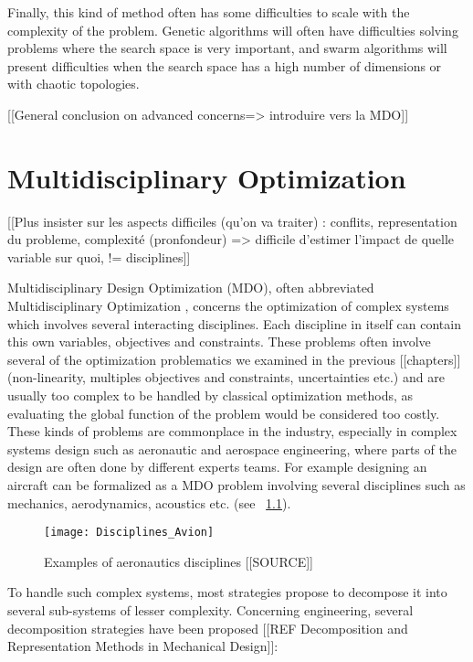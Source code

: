 Finally, this kind of method often has some difficulties to scale with the complexity of the problem. Genetic algorithms will often have difficulties solving problems where the search space is very important, and swarm algorithms will present difficulties when the search space has a high number of dimensions or with chaotic topologies.

[[General conclusion on advanced concerns=> introduire vers la MDO]]

\chapter{Multidisciplinary Optimization}

[[Plus insister sur les aspects difficiles (qu'on va traiter) : conflits, representation du probleme, complexité (pronfondeur) => difficile d'estimer l'impact de quelle variable sur quoi, != disciplines]]

Multidisciplinary Design Optimization (MDO), often abbreviated Multidisciplinary Optimization , concerns the optimization of complex systems which involves several interacting disciplines. Each discipline in itself can contain this own variables, objectives and constraints. These problems often involve several of the optimization problematics we examined in the previous [[chapters]] (non-linearity, multiples objectives and constraints, uncertainties etc.) and are usually too complex to be handled by classical optimization methods, as evaluating the global function of the problem would be considered too costly.
These kinds of problems are commonplace in the industry, especially in complex systems design such as aeronautic and aerospace engineering, where parts of the design are often done by different experts teams. For example designing an aircraft can be formalized as a MDO problem involving several disciplines such as mechanics, aerodynamics, acoustics etc. (see \figurename\ \ref{aero-disc}).

\begin{figure}
\centering
\texttt{[image: Disciplines\_Avion]}
\caption{Examples of aeronautics disciplines [[SOURCE]]}
\label{aero-disc}
\end{figure}

To handle such complex systems, most strategies propose to decompose it into several sub-systems of lesser complexity. Concerning engineering, several decomposition strategies have been proposed [[REF Decomposition and Representation Methods in Mechanical Design]]:

